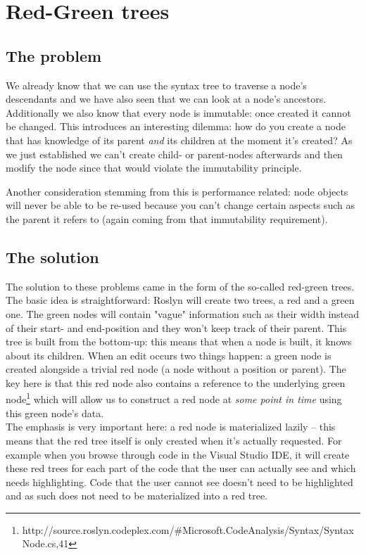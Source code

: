 \section{Red-Green trees}
\label{sec:red-green-trees}

\subsection{The problem}
\label{sec:rg-trees-problem}

We already know that we can use the syntax tree to traverse a node's descendants and we have also seen that we can look at a node's ancestors. Additionally we also know that every node is immutable: once created it cannot be changed. This introduces an interesting dilemma: how do you create a node that has knowledge of its parent \textit{and} its children at the moment it's created? As we just established we can't create child- or parent-nodes afterwards and then modify the node since that would violate the immutability principle.

Another consideration stemming from this is performance related: node objects will never be able to be re-used because you can't change certain aspects such as the parent it refers to (again coming from that immutability requirement).

\subsection{The solution}
\label{sec:rg-trees-solution}

The solution to these problems came in the form of the so-called red-green trees. The basic idea is straightforward: Roslyn will create two trees, a red and a green one. The green nodes will contain "vague" information such as their width instead of their start- and end-position and they won't keep track of their parent. This tree is built from the bottom-up: this means that when a node is built, it knows about its children.
When an edit occurs two things happen: a green node is created alongside a trivial red node (a node without a position or parent). The key here is that this red node also contains a reference to the underlying green node\footnote{http://source.roslyn.codeplex.com/\#Microsoft.CodeAnalysis/Syntax/SyntaxNode.cs,41} which will allow us to construct a red node at \textit{some point in time} using this green node's data.  \\
The emphasis is very important here: a red node is materialized lazily -- this means that the red tree itself is only created when it's actually requested. For example when you browse through code in the Visual Studio IDE, it will create these red trees for each part of the code that the user can actually see and which needs highlighting. Code that the user cannot see doesn't need to be highlighted and as such does not need to be materialized into a red tree.

